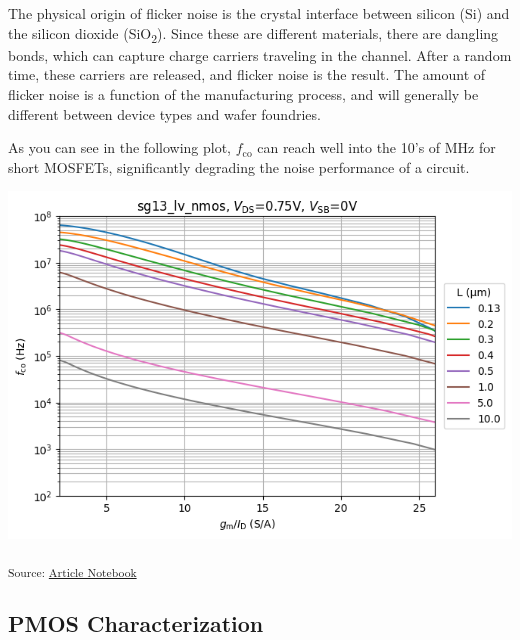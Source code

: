 \documentclass[
  a4paper,
  DIV=11,
  numbers=noendperiod]{scrartcl}
\begin{document}
\begin{tcolorbox}[enhanced jigsaw, titlerule=0mm, left=2mm, coltitle=black, toprule=.15mm, breakable, opacitybacktitle=0.6, colframe=quarto-callout-note-color-frame, bottomtitle=1mm, toptitle=1mm, opacityback=0, colbacktitle=quarto-callout-note-color!10!white, title=\textcolor{quarto-callout-note-color}{\faInfo}\hspace{0.5em}{MOSFET Flicker Noise}, arc=.35mm, rightrule=.15mm, colback=white, bottomrule=.15mm, leftrule=.75mm]

The physical origin of flicker noise is the crystal interface between
silicon (Si) and the silicon dioxide (SiO\textsubscript{2}). Since these
are different materials, there are dangling bonds, which can capture
charge carriers traveling in the channel. After a random time, these
carriers are released, and flicker noise is the result. The amount of
flicker noise is a function of the manufacturing process, and will
generally be different between device types and wafer foundries.

\end{tcolorbox}

As you can see in the following plot, \(f_\mathrm{co}\) can reach well
into the 10's of MHz for short MOSFETs, significantly degrading the
noise performance of a circuit.

\includegraphics{index_files/figure-latex/.-sizing-techsweep_sg13_plots_nmos-cell-14-output-1.png}

\textsubscript{Source:
\href{https://iic-jku.github.io/analog-circuit-design/index.qmd.html}{Article
Notebook}}

\subsection{PMOS Characterization}\label{sec-techsweep-pmos}
\end{document}
